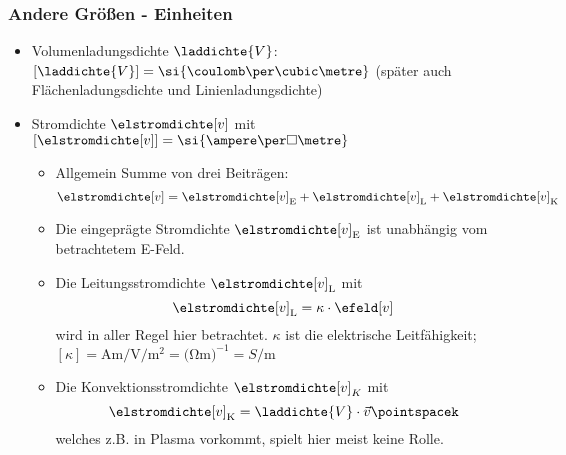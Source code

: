   \begin{frame}
    \frametitle{Andere Größen - Einheiten}
    \begin{itemize}[<+->]
      \item Volumenladungsdichte $\laddichte{V}$:
        $\left[\laddichte{V}\right] = \si{\coulomb\per\cubic\metre} $
        (später auch Flächenladungsdichte und Linienladungsdichte)
        \item Stromdichte	\(\elstromdichte[v]\) mit
          \(\left[\elstromdichte[v]\right] =
          \si{\ampere\per\square\metre} \)
          \begin{itemize}[<+->]
		\item Allgemein Summe von drei Beiträgen:
		\begin{equation*}
			\elstromdichte[v] = \elstromdichte[v]_\mathrm{E} + \elstromdichte[v]_\mathrm{L} + \elstromdichte[v]_\mathrm{K}
		\end{equation*}
                \item Die eingeprägte Stromdichte
                  \(\elstromdichte[v]_\mathrm{E}\) ist unabhängig vom
                  betrachtetem E-Feld.
                \item Die Leitungsstromdichte \(\elstromdichte[v]_\mathrm{L}\) mit
		\begin{equation*}
			\elstromdichte[v]_\mathrm{L} = \kappa \cdot \efeld[v]
		\end{equation*}
		wird in aller Regel hier betrachtet. $\kappa$ ist die
                elektrische Leitfähigkeit; $\left[\kappa\right] =\si{\ampere\metre\per\volt\per\square\metre}=\si{(\ohm\metre)^{-1}}=\si{S\per\metre}$
                \item Die Konvektionsstromdichte \(\elstromdichte[v]_K\) mit
		\begin{equation*}
			\elstromdichte[v]_\mathrm{K} = \laddichte{V} \cdot \vec{v} \pointspacek
		\end{equation*}
		welches z.B. in Plasma vorkommt, spielt hier meist
                keine Rolle. 
\end{itemize}
              \end{itemize}
    \end{frame}
